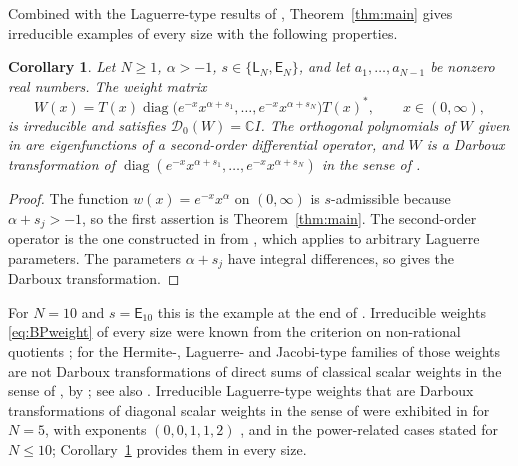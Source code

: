 \documentclass[11pt]{amsart}
\newtheorem{corollary}[theorem]{Corollary}
\theoremstyle{definition}
\theoremstyle{remark}
\numberwithin{equation}{section}
\newcommand{\C}{\mathbb{C}}
\newcommand{\diag}{\operatorname{diag}}
\newcommand{\cD}{\mathcal{D}}
\newcommand{\sL}{\mathsf{L}}
\newcommand{\sE}{\mathsf{E}}
\begin{document}
Combined with the Laguerre-type results of \cite[Section~4.1]{BP26},
Theorem~\ref{thm:main} gives irreducible examples of every size with the
following properties.

\begin{corollary}\label{cor:laguerre}
Let $N\ge1$, $\alpha>-1$, $s\in\{\sL_N,\sE_N\}$, and let $a_1,\dots,a_{N-1}$
be nonzero real numbers. The weight matrix
\[
W(x)=T(x)\diag\bigl(e^{-x}x^{\alpha+s_1},\dots,e^{-x}x^{\alpha+s_N}\bigr)
T(x)^*,\qquad x\in(0,\infty),
\]
is irreducible and satisfies $\cD_0(W)=\C I$. The orthogonal polynomials of
$W$ given in \cite[Theorem~3.1]{BP26} are eigenfunctions of a second-order differential
operator, and $W$ is a Darboux transformation of
$\diag(e^{-x}x^{\alpha+s_1},\dots,e^{-x}x^{\alpha+s_N})$ in the sense of
\cite[Definition~2.6]{BP26}.
\end{corollary}

\begin{proof}
The function $w(x)=e^{-x}x^\alpha$ on $(0,\infty)$ is $s$-admissible because
$\alpha+s_j>-1$, so the first assertion is Theorem~\ref{thm:main}. The
second-order operator is the one constructed in \cite[Section~4.1]{BP26}
from \cite[Theorem~4.1]{BP26}, which applies to arbitrary Laguerre
parameters. The parameters $\alpha+s_j$ have integral differences, so
\cite[Theorem~4.3]{BP26} gives the Darboux transformation.
\end{proof}

For $N=10$ and $s=\sE_{10}$ this is the example at the end of
\cite[Section~5]{BP26}. Irreducible weights \eqref{eq:BPweight} of every size
were known from the criterion on non-rational quotients
\cite[Proposition~5.6]{BP26}; for the Hermite-, Laguerre- and Jacobi-type
families of \cite[Definition~1.1]{BPP} those weights are not Darboux
transformations of direct sums of classical scalar weights in the sense of
\cite[Definition~2.5]{BPP}, by \cite[Theorem~1.4]{BPP}; see also
\cite[Section~4]{BP26}. Irreducible Laguerre-type weights that are Darboux
transformations of diagonal scalar weights in the sense of
\cite[Definition~2.6]{BP26} were exhibited in \cite{BP26} for
$N=5$, with exponents $(0,0,1,1,2)$ \cite[(4.3) and Section~5]{BP26}, and in
the power-related cases stated for $N\le10$; Corollary~\ref{cor:laguerre}
provides them in every size.
\end{document}
